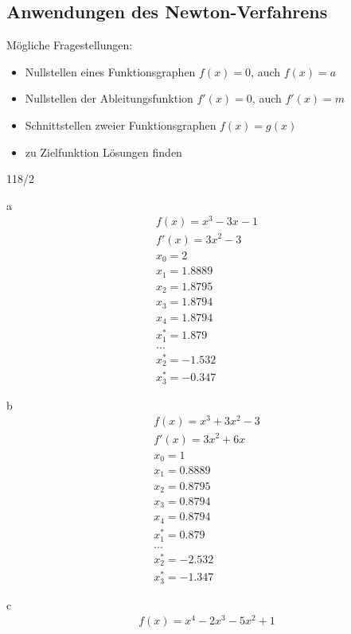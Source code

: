 \subsection{Anwendungen des Newton-Verfahrens}
Mögliche Fragestellungen: \\
\begin{itemize}
  \item Nullstellen eines Funktionsgraphen $f(x) = 0$, auch $f(x) = a$
  \item Nullstellen der Ableitungsfunktion $f'(x) = 0$, auch $f'(x) = m$
  \item Schnittstellen zweier Funktionsgraphen $f(x) = g(x)$
  \item zu Zielfunktion Lösungen finden
\end{itemize}
\newpage
\begin{exercise}{118/2}
  \item [a]
  \begin{gather*}
    f(x) = x^3 - 3x - 1 \\
    f'(x) = 3x^2 - 3 \\
    x_0 = 2 \\
    x_1 = 1.8889 \\
    x_2 = 1.8795 \\
    x_3 = 1.8794 \\
    x_4 = 1.8794 \\
    x_1^\ast = 1.879 \\
    ...\\
    x_2^\ast = -1.532 \\
    x_3^\ast = -0.347
  \end{gather*}
  \item [b]
  \begin{gather*}
    f(x) = x^3 + 3x^2 - 3 \\
    f'(x) = 3x^2 + 6x \\
    x_0 = 1 \\
    x_1 = 0.8889 \\
    x_2 = 0.8795 \\
    x_3 = 0.8794 \\
    x_4 = 0.8794 \\
    x_1^\ast = 0.879 \\
    ...\\
    x_2^\ast = -2.532 \\
    x_3^\ast = -1.347
  \end{gather*}
  \item [c]
  \begin{gather*}
    f(x) = x^4 - 2x^3 - 5x^2 + 1 \\

\end{gather*}
\end{exercise}
